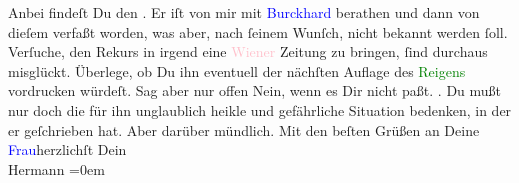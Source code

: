           \pstart
           {\pb}Anbei findeſt Du den \label{K_L01337_2v}\label{K_L01337_2h}. Er iſt von mir
               mit \textcolor{blue}{Burckhard}{}\ledrightnote{\textcolor{blue}{Max Eugen Burckhard}} berathen und dann von dieſem
               verfaßt worden, was aber, nach ſeinem Wunſch, nicht bekannt werden ſoll. Verſuche,
               den Rekurs in irgend eine \textcolor{pink}{Wiener}{}\ledrightnote{\textcolor{pink}{Wien}} Zeitung zu bringen,
               ſind durchaus misglückt. Überlege, ob Du ihn eventuell der nächſten Auflage des \textcolor{green}{Reigens}{}\ledrightnote{\textcolor{green}{Reigen. Zehn Dialoge}} vordrucken würdeſt. Sag aber nur offen Nein,
               wenn es Dir nicht paßt.\pend
           \pstart
           \label{K_L01337_3v}\label{K_L01337_3h}. Du mußt nur doch die für ihn
               unglaublich heikle und gefährliche Situation bedenken, in der er geſchrieben hat.
               Aber darüber mündlich.\pend
           \pstart
           Mit den beſten Grüßen an Deine \textcolor{blue}{Frau}{}herzlichſt Dein{\\[\baselineskip]}\spacefill\mbox{Hermann}\pend
           \leftskip=0em{}\endnumbering{}  
      